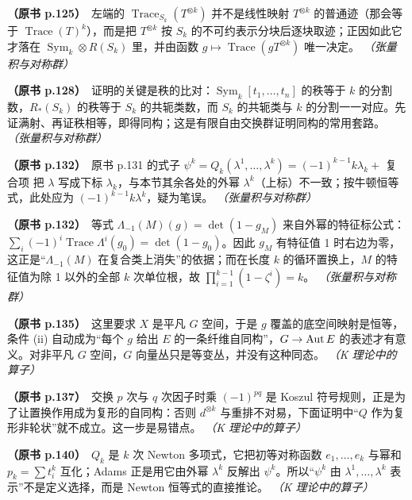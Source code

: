 \noindent \textbf{（原书 p.125）}\ 左端的 $\operatorname{Trace}_{S_k}(T^{\otimes k})$ 并不是线性映射 $T^{\otimes k}$ 的普通迹（那会等于 $\operatorname{Trace}(T)^k$），而是把 $T^{\otimes k}$ 按 $S_k$ 的不可约表示分块后逐块取迹；正因如此它才落在 $\operatorname{Sym}_k\otimes R(S_k)$ 里，并由函数 $g\mapsto\operatorname{Trace}(gT^{\otimes k})$ 唯一决定。 \textit{（张量积与对称群）}\par\smallskip

\noindent \textbf{（原书 p.128）}\ 证明的关键是秩的比对：$\operatorname{Sym}_k[t_1,\ldots,t_n]$ 的秩等于 $k$ 的分割数，$R_*(S_k)$ 的秩等于 $S_k$ 的共轭类数，而 $S_k$ 的共轭类与 $k$ 的分割一一对应。先证满射、再证秩相等，即得同构；这是有限自由交换群证明同构的常用套路。 \textit{（张量积与对称群）}\par\smallskip

\noindent \textbf{（原书 p.132）}\ 原书 p.131 的式子 $\psi^k=Q_k(\lambda^1,\ldots,\lambda^k)=(-1)^{k-1}k\lambda_k+$ 复合项 把 $\lambda$ 写成下标 $\lambda_k$，与本节其余各处的外幂 $\lambda^k$（上标）不一致；按牛顿恒等式，此处应为 $(-1)^{k-1}k\lambda^k$，疑为笔误。 \textit{（张量积与对称群）}\par\smallskip

\noindent \textbf{（原书 p.132）}\ 等式 $\Lambda_{-1}(M)(g)=\det(1-g_M)$ 来自外幂的特征标公式：$\sum_i(-1)^i\operatorname{Trace}\Lambda^i(g_0)=\det(1-g_0)$。因此 $g_M$ 有特征值 1 时右边为零，这正是“$\Lambda_{-1}(M)$ 在复合类上消失”的依据；而在长度 $k$ 的循环置换上，$M$ 的特征值为除 1 以外的全部 $k$ 次单位根，故 $\prod_{i=1}^{k-1}(1-\zeta^i)=k$。 \textit{（张量积与对称群）}\par\smallskip

\noindent \textbf{（原书 p.135）}\ 这里要求 $X$ 是平凡 $G$ 空间，于是 $g$ 覆盖的底空间映射是恒等，条件 (ii) 自动成为“每个 $g$ 给出 $E$ 的一条纤维自同构”，$G\to\operatorname{Aut} E$ 的表述才有意义。对非平凡 $G$ 空间，$G$ 向量丛只是等变丛，并没有这种同态。 \textit{（K 理论中的算子）}\par\smallskip

\noindent \textbf{（原书 p.137）}\ 交换 $p$ 次与 $q$ 次因子时乘 $(-1)^{pq}$ 是 Koszul 符号规则，正是为了让置换作用成为复形的自同构：否则 $d^{\otimes k}$ 与重排不对易，下面证明中“$Q$ 作为复形非轮状”就不成立。这一步是易错点。 \textit{（K 理论中的算子）}\par\smallskip

\noindent \textbf{（原书 p.140）}\ $Q_k$ 是 $k$ 次 Newton 多项式，它把初等对称函数 $e_1,\dots,e_k$ 与幂和 $p_k=\sum t_i^k$ 互化；Adams 正是用它由外幂 $\lambda^k$ 反解出 $\psi^k$。所以“$\psi^k$ 由 $\lambda^1,\dots,\lambda^k$ 表示”不是定义选择，而是 Newton 恒等式的直接推论。 \textit{（K 理论中的算子）}\par\smallskip

